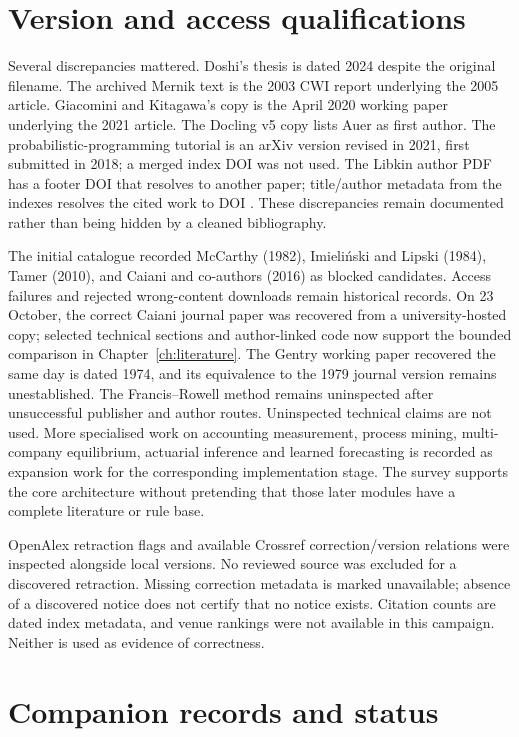 \section{Version and access qualifications}

Several discrepancies mattered. Doshi's thesis is dated 2024 despite the
original filename. The archived Mernik text is the 2003 CWI report underlying
the 2005 article. Giacomini and Kitagawa's copy is the April 2020 working paper
underlying the 2021 article. The Docling v5 copy lists Auer as first author.
The probabilistic-programming tutorial is an arXiv version revised in 2021,
first submitted in 2018; a merged index DOI was not used. The Libkin author
PDF has a footer DOI that resolves to another paper; title/author metadata
from the indexes resolves the cited work to DOI
. These discrepancies remain documented rather
than being hidden by a cleaned bibliography.

The initial catalogue recorded McCarthy (1982), Imieliński and Lipski (1984),
Tamer (2010), and Caiani and co-authors (2016) as blocked candidates. Access
failures and rejected wrong-content downloads remain historical records. On
23 October, the correct Caiani journal paper was recovered from a
university-hosted copy; selected technical sections and author-linked code now
support the bounded comparison in Chapter~\ref{ch:literature}. The Gentry
working paper recovered the same day is dated 1974, and its equivalence to the
1979 journal version remains unestablished. The Francis--Rowell method remains
uninspected after unsuccessful publisher and author routes. Uninspected
technical claims are not used. More specialised work on accounting
measurement, process mining, multi-company equilibrium, actuarial inference
and learned forecasting is recorded as expansion work for the corresponding
implementation stage. The survey supports the core architecture without
pretending that those later modules have a complete literature or rule base.

OpenAlex retraction flags and available Crossref correction/version relations
were inspected alongside local versions. No reviewed source was excluded for
a discovered retraction. Missing correction metadata is marked unavailable;
absence of a discovered notice does not certify that no notice exists.
Citation counts are dated index metadata, and venue rankings were not available
in this campaign. Neither is used as evidence of correctness.

\section{Companion records and status}

